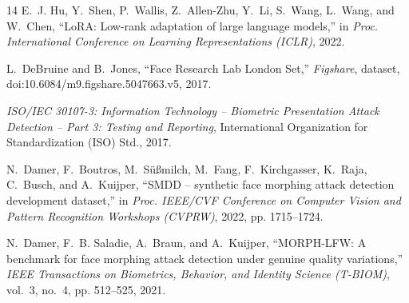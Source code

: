 \documentclass[11pt,a4paper]{article}
\begin{document}
\begin{thebibliography}{14}
E.~J. Hu, Y.~Shen, P.~Wallis, Z.~Allen-Zhu, Y.~Li, S.~Wang, L.~Wang, and W.~Chen, ``LoRA: Low-rank adaptation of large language models,'' in \emph{Proc. International Conference on Learning Representations (ICLR)}, 2022.

L.~DeBruine and B.~Jones, ``Face Research Lab London Set,'' \emph{Figshare}, dataset, doi:10.6084/m9.figshare.5047663.v5, 2017.

\emph{ISO/IEC 30107-3: Information Technology -- Biometric Presentation Attack Detection -- Part 3: Testing and Reporting}, International Organization for Standardization (ISO) Std., 2017.

N.~Damer, F.~Boutros, M.~S{\"u}{\ss}milch, M.~Fang, F.~Kirchgasser, K.~Raja, C.~Busch, and A.~Kuijper, ``SMDD -- synthetic face morphing attack detection development dataset,'' in \emph{Proc. IEEE/CVF Conference on Computer Vision and Pattern Recognition Workshops (CVPRW)}, 2022, pp. 1715--1724.

N.~Damer, F.~B. Saladie, A.~Braun, and A.~Kuijper, ``MORPH-LFW: A benchmark for face morphing attack detection under genuine quality variations,'' \emph{IEEE Transactions on Biometrics, Behavior, and Identity Science (T-BIOM)}, vol.~3, no.~4, pp. 512--525, 2021.

\end{thebibliography}
\endgroup
\end{document}
